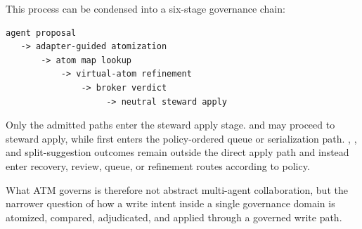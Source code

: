 \documentclass[9pt,letterpaper]{extarticle}
\begin{document}
This process can be condensed into a six-stage governance chain:

\begin{paperAlgoBox}
\begin{Verbatim}[breaklines=true,fontsize=\scriptsize]
agent proposal
   -> adapter-guided atomization
       -> atom map lookup
           -> virtual-atom refinement
               -> broker verdict
                    -> neutral steward apply
\end{Verbatim}
\end{paperAlgoBox}

Only the admitted paths enter the steward apply stage. \texttt{} and \texttt{} may proceed to steward apply, while \texttt{} first enters the policy-ordered queue or serialization path. \texttt{}, \texttt{}, and split-suggestion outcomes remain outside the direct apply path and instead enter recovery, review, queue, or refinement routes according to policy.

What ATM governs is therefore not abstract {}multi-agent collaboration{}, but the narrower question of how a write intent inside a single governance domain is atomized, compared, adjudicated, and applied through a governed write path.
\end{document}
